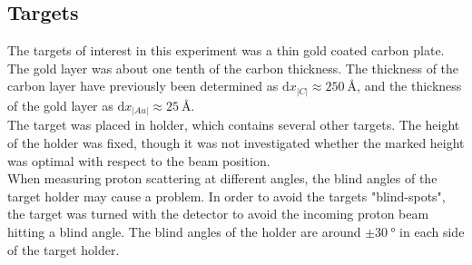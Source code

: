 \subsection{Targets}
The targets of interest in this experiment was a thin gold coated carbon plate.
The gold layer was about one tenth of the carbon thickness. The thickness of
the carbon layer have previously been determined as $\mathrm{d}x_|C|
\approx\SI{250}{\angstrom}$, and the thickness of the gold layer as $\mathrm{d}x_|Au|\approx\SI{25}{\angstrom}$.\footnotemark \\
The target was placed in holder, which contains several other targets. The height of the holder was fixed, though it was not investigated whether the marked height was optimal with respect to the beam position.\\
%
When measuring proton scattering at different angles, the blind angles of the target holder may cause a problem. In order to avoid the targets "blind-spots", the target was turned with the detector to avoid the incoming proton beam hitting a blind angle. The blind angles of the holder are around $\pm \SI{30}{\degree}$ in each side of the target holder.

%
